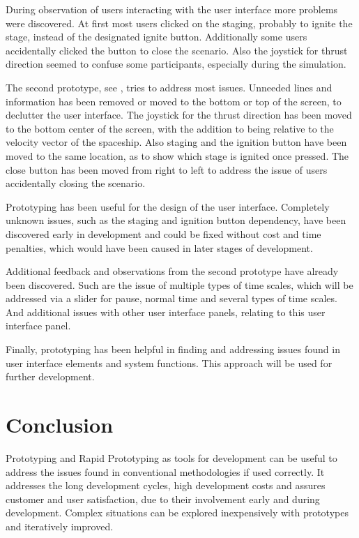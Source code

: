 \documentclass[runningheads]{llncs}
\begin{document}
During observation of users interacting with the user interface more problems were discovered. At first most users clicked on the
staging, probably to ignite the stage, instead of the designated ignite button. Additionally some users accidentally clicked the
button to close the scenario. Also the joystick for thrust direction seemed to confuse some participants, especially during the simulation.

The second prototype, see , tries to address most issues. Unneeded lines and information has been removed or moved to the bottom 
or top of the screen, to declutter the user interface. The joystick for the thrust direction has been moved to the bottom center of the screen, with 
the addition to being relative to the velocity vector of the spaceship. Also staging and the ignition button have been moved to the 
same location, as to show which stage is ignited once pressed. The close button has been moved from right to left to address the issue of users accidentally closing the scenario.

Prototyping has been useful for the design of the user interface. Completely unknown issues, such as the staging and ignition button dependency,
have been discovered early in development and could be fixed without cost and time penalties, which would have been caused in later stages of development.

Additional feedback and observations from the second prototype have already been discovered. Such are the issue of multiple types of time scales, which
will be addressed via a slider for pause, normal time and several types of time scales. And additional issues with other user interface panels, relating
to this user interface panel.

Finally, prototyping has been helpful in finding and addressing issues found in user interface elements and system functions. This approach
will be used for further development.

\section{Conclusion}
Prototyping and Rapid Prototyping as tools for development can be useful to address the issues found in conventional methodologies if used correctly. 
It addresses the long development cycles, high development costs and assures customer and user satisfaction, due to their involvement
early and during development. Complex situations can be explored inexpensively with prototypes and iteratively improved.
\end{document}
